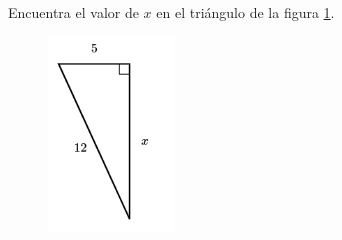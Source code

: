 \question[15]  Encuentra el valor de $x$ en el triángulo de la figura \ref{fig:lados_pitagoras_31}.
\begin{figure}[H]
    \begin{center}
        \includegraphics[width=0.3\textwidth]{../images/lados_pitagoras_31.png}
    \end{center}
    \caption{}
    \label{fig:lados_pitagoras_31}
\end{figure}